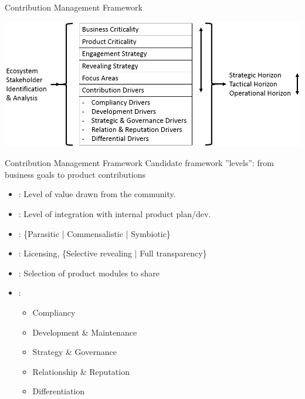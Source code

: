 \documentclass{slideclass}
\begin{document}
\begin{Slide}{Contribution Management Framework}

\vspace{1em}\includegraphics[width=\textwidth]{img/framework_picture}
\end{Slide}

\begin{Slide}{Contribution Management Framework}\SlideFontSmall
Candidate framework ''levels'': from business goals to product contributions
\begin{itemize}
\item {}: Level of value drawn from the community.
\item {}: Level of integration with internal product plan/dev.
\item {}: \{Parasitic | Commensalistic | Symbiotic\}
\item {}: Licensing, \{Selective revealing | Full transparency\}
\item {}: Selection of product modules to share
\item {}: 
\begin{itemize}\SlideFontSmall
\item Compliancy
\item Development \& Maintenance
\item Strategy \& Governance
\item Relationship \& Reputation
\item Differentiation
\end{itemize}
\end{itemize}
\end{Slide}
\end{document}
